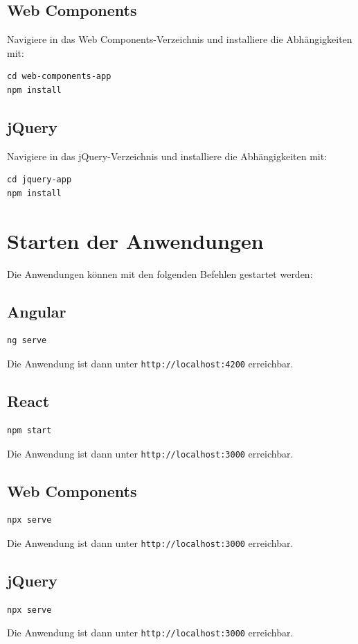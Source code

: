 \documentclass[oneside]{ausarbeitung}
\begin{document}
\subsection{Web Components}
Navigiere in das Web Components-Verzeichnis und installiere die Abhängigkeiten mit:
\begin{verbatim}
cd web-components-app
npm install
\end{verbatim}

\subsection{jQuery}
Navigiere in das jQuery-Verzeichnis und installiere die Abhängigkeiten mit:
\begin{verbatim}
cd jquery-app
npm install
\end{verbatim}

\section{Starten der Anwendungen}
Die Anwendungen können mit den folgenden Befehlen gestartet werden:

\subsection{Angular}
\begin{verbatim}
ng serve
\end{verbatim}
Die Anwendung ist dann unter \texttt{http://localhost:4200} erreichbar.

\subsection{React}
\begin{verbatim}
npm start
\end{verbatim}
Die Anwendung ist dann unter \texttt{http://localhost:3000} erreichbar.

\subsection{Web Components}
\begin{verbatim}
npx serve
\end{verbatim}
Die Anwendung ist dann unter \texttt{http://localhost:3000} erreichbar.

\subsection{jQuery}
\begin{verbatim}
npx serve
\end{verbatim}
Die Anwendung ist dann unter \texttt{http://localhost:3000} erreichbar.
\end{document}

